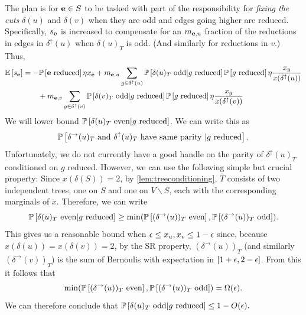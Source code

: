 \begin{example}
The plan is for $\bbe\in S$ to be tasked with part of the responsibility for {\em fixing the cuts} $\delta(u)$ and $\delta(v)$ when they are odd and edges going higher are reduced. Specifically, $s_\bbe$ is increased to compensate for an $m_{\bbe,u}$  fraction of the reductions in edges in $\delta^\uparrow(u)$ when $\delta(u)_T$ is odd. (And similarly for reductions in $v$.) 
Thus,
\begin{align}
	\E{s_\bbe} &= -\P{\bbe\text{ reduced}} \eta x_\bbe + m_{\bbe,u}\sum_{g\in \delta^\uparrow(u)} \P{\delta(u)_T\text{ odd}|g \text{ reduced} }\P{g \text{ reduced}}\eta \frac{x_g}{x(\delta^\uparrow(u))}\notag\\
	&\quad\quad +  m_{\bbe,v}\sum_{g\in \delta^\uparrow(v)} \P{\delta(v)_T\text{ odd}|g \text{ reduced} }\P{g \text{ reduced}}\eta \frac{x_g}{x(\delta^\uparrow(v))} \label{eq:sfUB}
\end{align}
We will lower bound  $\P{\delta(u)_T\text{ even}|g\text{ reduced}}$. We can write this as
$$\P{\delta^\rightarrow (u)_T\text{ and }\delta^\uparrow (u)_T\text{ have same parity } | g \text{ reduced}}.$$
Unfortunately, we do not currently have a  good handle on the parity of $\delta^\uparrow (u)_T$ conditioned on $g$ reduced. 
However,  we can use 
the following simple but crucial property: Since $x(\delta(S)) = 2$, by \cref{lem:treeconditioning}, $T$ consists of two independent trees, one on $S$ and one on $V \smallsetminus S$, each with the corresponding marginals of $x$.
Therefore, we can write$$\P{\delta(u)_T\text{ even}|g\text{ reduced}} \ge \min (\P{(\delta^\rightarrow (u))_T \text{ even}}, \P{(\delta^\rightarrow (u))_T \text{ odd}}).$$
This gives us a reasonable bound when $\eps \le x_u, x_v \le 1- \eps$ since, because
$x(\delta(u)) = x(\delta(v))=2$, 
by the SR property, $(\delta^\rightarrow (u))_T$ (and similarly $(\delta^\rightarrow (v))_T$) is the sum of Bernoulis with expectation in $[1+\eps, 2-\eps]$. From this it follows that 
$$ \min (\P{(\delta^\rightarrow (u))_T \text{ even}}, \P{(\delta^\rightarrow (u))_T \text{ odd}}) =\Omega (\epsilon). $$We can therefore conclude that 
$\P{\delta(u)_T\text{ odd}|g\text{ reduced}}  \le 1- O(\eps).$


\end{example}
